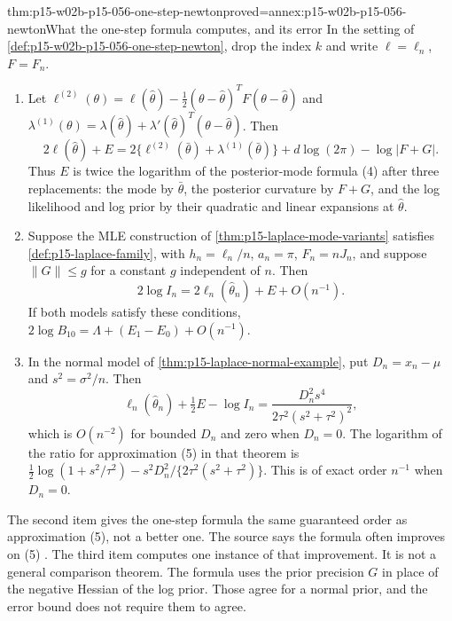 \begin{hbtheorem}{thm:p15-w02b-p15-056-one-step-newton}{proved=annex:p15-w02b-p15-056-newton}{What the one-step formula computes, and its error}
In the setting of \cref{def:p15-w02b-p15-056-one-step-newton}, drop the
index \(k\) and write \(\ell=\ell_n\), \(F=F_n\).
\begin{enumerate}
\item Let \(\ell^{(2)}(\theta)=\ell(\widehat\theta)
-\tfrac12(\theta-\widehat\theta)^TF(\theta-\widehat\theta)\) and
\(\lambda^{(1)}(\theta)=\lambda(\widehat\theta)
+\lambda'(\widehat\theta)^T(\theta-\widehat\theta)\). Then
\[
 2\ell(\widehat\theta)+E
 =2\{\ell^{(2)}(\bar\theta)+\lambda^{(1)}(\bar\theta)\}
 +d\log(2\pi)-\log|F+G| .
\]
Thus \(E\) is twice the logarithm of the posterior-mode formula (4) after
three replacements: the mode by \(\bar\theta\), the posterior curvature by
\(F+G\), and the log likelihood and log prior by their quadratic and
linear expansions at \(\widehat\theta\).
\item Suppose the MLE construction of \cref{thm:p15-laplace-mode-variants}
satisfies \cref{def:p15-laplace-family}, with \(h_n=\ell_n/n\),
\(a_n=\pi\), \(F_n=nJ_n\), and suppose \(\|G\|\leq g\) for a constant
\(g\) independent of \(n\). Then
\[
 2\log I_n=2\ell_n(\widehat\theta_n)+E+O(n^{-1}).
\]
If both models satisfy these conditions,
\(2\log B_{10}=\Lambda+(E_1-E_0)+O(n^{-1})\).
\item In the normal model of \cref{thm:p15-laplace-normal-example}, put
\(D_n=x_n-\mu\) and \(s^2=\sigma^2/n\). Then
\[
 \ell_n(\widehat\theta_n)+\tfrac12E-\log I_n
 =\frac{D_n^2s^4}{2\tau^2(s^2+\tau^2)^2},
\]
which is \(O(n^{-2})\) for bounded \(D_n\) and zero when \(D_n=0\).
The logarithm of the ratio for approximation (5) in that theorem is
\(\tfrac12\log(1+s^2/\tau^2)-s^2D_n^2/\{2\tau^2(s^2+\tau^2)\}\). This is
of exact order \(n^{-1}\) when \(D_n=0\).
\end{enumerate}
\end{hbtheorem}

The second item gives the one-step formula the same guaranteed order as
approximation (5), not a better one. The source says the formula often
improves on (5) \cite[Sec.~4.1.2, p.~778]{KassRaftery1995BayesFactors}.
The third item computes one instance of that improvement. It is not a
general comparison theorem. The formula uses the prior precision \(G\)
in place of the negative Hessian of the log prior. Those agree for a
normal prior, and the error bound does not require them to agree.

